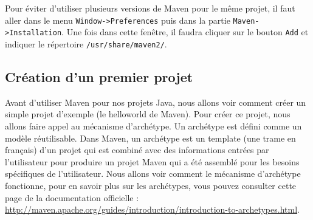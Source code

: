 \documentclass[a4paper,11pt]{article}
\begin{document}
Pour éviter d'utiliser plusieurs versions de Maven pour le même projet, il faut aller dans le menu \texttt{Window->Preferences} 
puis dans la partie \texttt{Maven->Installation}. Une fois dans cette fenêtre, il faudra cliquer sur le bouton \texttt{Add} 
et indiquer le répertoire \texttt{/usr/share/maven2/}.

\subsection{Création d'un premier projet}
Avant d'utiliser Maven pour nos projets Java, nous allons voir comment créer un simple projet 
d'exemple (le helloworld de Maven). Pour créer ce projet, nous allons faire appel au mécanisme d'archétype. Un archétype 
est défini comme un modèle réutilisable. Dans Maven, un archétype est un template (une trame en français) d'un projet 
qui est combiné avec des informations entrées par l'utilisateur pour produire un projet Maven qui a été assemblé pour 
les besoins spécifiques de l'utilisateur. Nous allons voir comment le mécanisme d'archétype fonctionne, pour en savoir 
plus sur les archétypes, vous pouvez consulter cette page de la documentation officielle : 
\url{http://maven.apache.org/guides/introduction/introduction-to-archetypes.html}.
\end{document}
